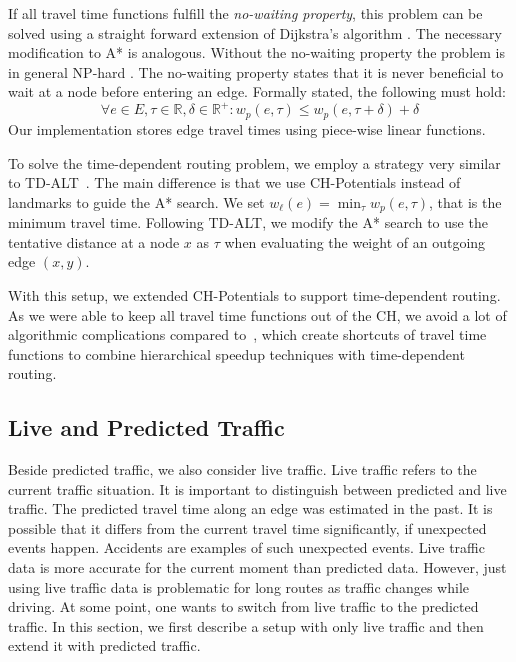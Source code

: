 \documentclass[a4paper,USenglish,cleveref, autoref, thm-restate]{lipics-v2019}
\begin{document}
If all travel time functions fulfill the \emph{no-waiting property}, this problem can be solved using a straight forward extension of Dijkstra's algorithm \cite{d-aassp-69}.
The necessary modification to A* is analogous.
Without the no-waiting property the problem is in general NP-hard \cite{or-tnp-89}.
The no-waiting property states that it is never beneficial to wait at a node before entering an edge.
Formally stated, the following must hold:\[
\forall e\in E,\tau\in \mathbb{R},\delta\in \mathbb{R}^+: w_p(e, \tau) \le w_p(e, \tau+\delta) + \delta
\]
Our implementation stores edge travel times using piece-wise linear functions.

To solve the time-dependent routing problem, we employ a strategy very similar to TD-ALT~\cite{ndls-bastd-12,dw-lbrdg-07}.
The main difference is that we use CH-Potentials instead of landmarks to guide the A* search.
We set $w_\ell(e) = \min_\tau w_p(e,\tau)$, that is the minimum travel time.
Following TD-ALT, we modify the A* search to use the tentative distance at a node $x$ as $\tau$ when evaluating the weight of an outgoing edge $(x,y)$.

With this setup, we extended CH-Potentials to support time-dependent routing.
As we were able to keep all travel time functions out of the CH, we avoid a lot of algorithmic complications compared to~\cite{bgsv-mtdtt-13,bdpw-dtdrp-16,swz-sfert-19}, which create shortcuts of travel time functions to combine hierarchical speedup techniques with time-dependent routing.

\subsection{Live and Predicted Traffic}
\label{sec:live-predicted-traffic}

Beside predicted traffic, we also consider live traffic.
Live traffic refers to the current traffic situation.
It is important to distinguish between predicted and live traffic.
The predicted travel time along an edge was estimated in the past.
It is possible that it differs from the current travel time significantly, if unexpected events happen.
Accidents are examples of such unexpected events.
Live traffic data is more accurate for the current moment than predicted data.
However, just using live traffic data is problematic for long routes as traffic changes while driving.
At some point, one wants to switch from live traffic to the predicted traffic.
In this section, we first describe a setup with only live traffic and then extend it with predicted traffic.
\end{document}
